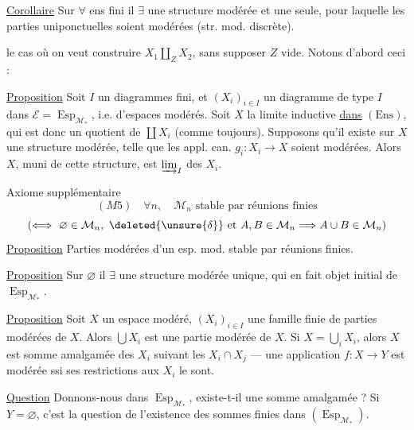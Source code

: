 \uline{Corollaire} Sur $\forall$ ens fini il $\exists$ une structure modérée et une seule, pour laquelle les parties uniponctuelles soient modérées (str. mod. discrète).

 le cas où on veut construire $X_1\amalg_Z X_2$, sans supposer $Z$ vide. Notons d'abord ceci :

\uline{Proposition} Soit $I$ un   diagrammes fini, et $(X_i)_{i\in I}$ un diagramme de type $I$ dans $\mathcal E=\operatorname{Esp}_{\mathcal M_*}$, i.e. d'espaces modérés. Soit $X$ la limite inductive \uline{dans} $(\mathrm{Ens})$, qui est donc un  quotient de $\coprod X_i$ (comme toujours). Supposons qu'il existe sur $X$ une structure modérée, telle que les appl. can. $g_i:X_i\longrightarrow X$ soient modérées. Alors $X$, muni de cette structure, est  $\varinjlim_I$ des $X_i$.

Axiome supplémentaire
\[
 (M5)\quad \forall n,\quad \mathcal M_n\text{ stable par réunions finies}
\]
\[
 (\Longleftrightarrow\ \varnothing\in\mathcal M_n,\ \deleted{\unsure{\delta}}\text{ et }A,B\in\mathcal M_n\Longrightarrow A\cup B\in\mathcal M_n)
\]
\uline{Proposition} Parties modérées d'un esp. mod. stable par réunions finies.

\uline{Proposition} Sur $\varnothing$ il $\exists$ une structure modérée unique, qui en fait objet initial de $\operatorname{Esp}_{\mathcal M_*}$.

\uline{Proposition} Soit $X$ un espace modéré, $(X_i)_{i\in I}$ une famille finie de parties modérées de $X$. Alors $\bigcup X_i$ est une partie modérée de $X$. Si $X=\bigcup_iX_i$, alors $X$ est somme amalgamée des $X_i$ suivant les $X_i\cap X_j$ --- une application $f:X\longrightarrow Y$  est modérée ssi ses restrictions aux $X_i$ le sont.

\uline{Question} Donnons-nous
dans $\operatorname{Esp}_{\mathcal M_*}$, existe-t-il une somme amalgamée ? Si $Y=\varnothing$, c'est la question de l'existence des sommes finies dans $(\operatorname{Esp}_{\mathcal M_*})$.

